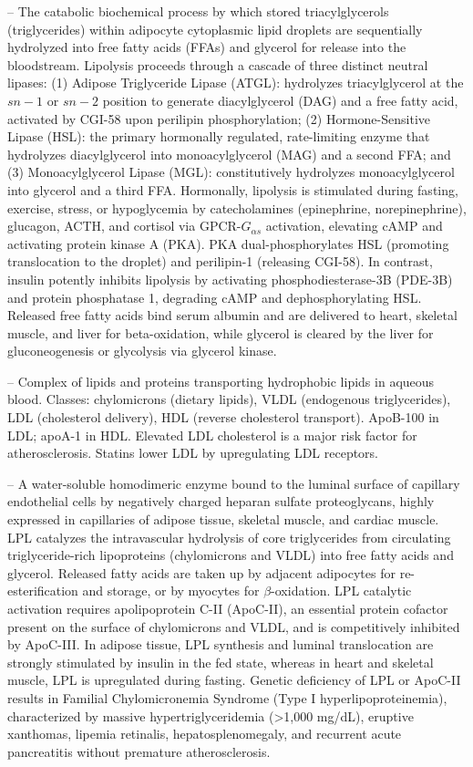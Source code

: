 -- The catabolic biochemical process by which stored triacylglycerols (triglycerides) within adipocyte cytoplasmic lipid droplets are sequentially hydrolyzed into free fatty acids (FFAs) and glycerol for release into the bloodstream. Lipolysis proceeds through a cascade of three distinct neutral lipases: (1) Adipose Triglyceride Lipase (ATGL): hydrolyzes triacylglycerol at the $sn-1$ or $sn-2$ position to generate diacylglycerol (DAG) and a free fatty acid, activated by CGI-58 upon perilipin phosphorylation; (2) Hormone-Sensitive Lipase (HSL): the primary hormonally regulated, rate-limiting enzyme that hydrolyzes diacylglycerol into monoacylglycerol (MAG) and a second FFA; and (3) Monoacylglycerol Lipase (MGL): constitutively hydrolyzes monoacylglycerol into glycerol and a third FFA. Hormonally, lipolysis is stimulated during fasting, exercise, stress, or hypoglycemia by catecholamines (epinephrine, norepinephrine), glucagon, ACTH, and cortisol via GPCR-$G_{\alpha s}$ activation, elevating cAMP and activating protein kinase A (PKA). PKA dual-phosphorylates HSL (promoting translocation to the droplet) and perilipin-1 (releasing CGI-58). In contrast, insulin potently inhibits lipolysis by activating phosphodiesterase-3B (PDE-3B) and protein phosphatase 1, degrading cAMP and dephosphorylating HSL. Released free fatty acids bind serum albumin and are delivered to heart, skeletal muscle, and liver for beta-oxidation, while glycerol is cleared by the liver for gluconeogenesis or glycolysis via glycerol kinase.

-- Complex of lipids and proteins transporting hydrophobic lipids in aqueous blood. Classes: chylomicrons (dietary lipids), VLDL (endogenous triglycerides), LDL (cholesterol delivery), HDL (reverse cholesterol transport). ApoB-100 in LDL; apoA-1 in HDL. Elevated LDL cholesterol is a major risk factor for atherosclerosis. Statins lower LDL by upregulating LDL receptors.

-- A water-soluble homodimeric enzyme bound to the luminal surface of capillary endothelial cells by negatively charged heparan sulfate proteoglycans, highly expressed in capillaries of adipose tissue, skeletal muscle, and cardiac muscle. LPL catalyzes the intravascular hydrolysis of core triglycerides from circulating triglyceride-rich lipoproteins (chylomicrons and VLDL) into free fatty acids and glycerol. Released fatty acids are taken up by adjacent adipocytes for re-esterification and storage, or by myocytes for $\beta$-oxidation. LPL catalytic activation requires apolipoprotein C-II (ApoC-II), an essential protein cofactor present on the surface of chylomicrons and VLDL, and is competitively inhibited by ApoC-III. In adipose tissue, LPL synthesis and luminal translocation are strongly stimulated by insulin in the fed state, whereas in heart and skeletal muscle, LPL is upregulated during fasting. Genetic deficiency of LPL or ApoC-II results in Familial Chylomicronemia Syndrome (Type I hyperlipoproteinemia), characterized by massive hypertriglyceridemia (>1,000 mg/dL), eruptive xanthomas, lipemia retinalis, hepatosplenomegaly, and recurrent acute pancreatitis without premature atherosclerosis.

